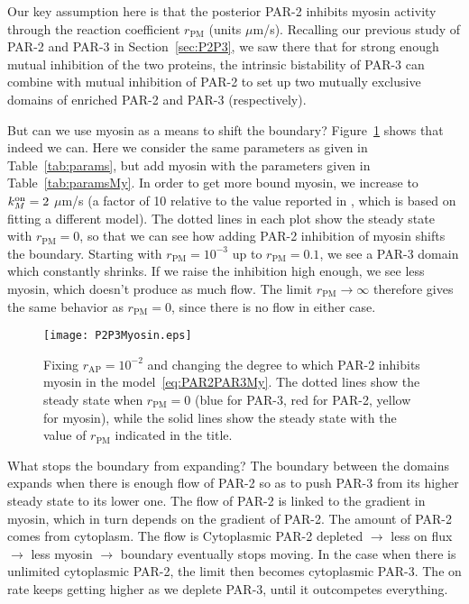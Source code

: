 \documentclass[11pt]{article}
\newcommand{\6}[1]{#1_{\text{6}}}
\newcommand{\3}[1]{#1_{\text{3}}}
\begin{document}
Our key assumption here is that the posterior PAR-2 inhibits myosin activity through the reaction coefficient $r_\text{PM}$ (units $\mu$m/s). Recalling our previous study of PAR-2 and PAR-3 in Section\ \ref{sec:P2P3}, we saw there that for strong enough mutual inhibition of the two proteins, the intrinsic bistability of PAR-3 can combine with mutual inhibition of PAR-2 to set up two mutually exclusive domains of enriched PAR-2 and PAR-3 (respectively). 

But can we use myosin as a means to shift the boundary? Figure\ \ref{fig:P2P3My} shows that indeed we can. Here we consider the same parameters as given in Table\ \ref{tab:params}, but add myosin with the parameters given in Table\ \ref{tab:paramsMy}. In order to get more bound myosin, we increase to $k^\text{on}_M=2$ $\mu$m/s (a factor of 10 relative to the value reported in \cite{gross2019guiding}, which is based on fitting a different model). The dotted lines in each plot show the steady state with $r_\text{PM}=0$, so that we can see how adding PAR-2 inhibition of myosin shifts the boundary. Starting with $r_\text{PM}=10^{-3}$ up to $r_\text{PM}=0.1$, we see a PAR-3 domain which constantly shrinks. If we raise the inhibition high enough, we see less myosin, which doesn't produce as much flow. The limit $r_\text{PM} \rightarrow \infty$ therefore gives the same behavior as $r_\text{PM}=0$, since there is no flow in either case.

\begin{figure}
\centering
\texttt{[image: P2P3Myosin.eps]}
\caption{\label{fig:P2P3My} Fixing $r_\text{AP}=10^{-2}$ and changing the degree to which PAR-2 inhibits myosin in the model\ \eqref{eq:PAR2PAR3My}. The dotted lines show the steady state when $r_\text{PM}=0$ (blue for PAR-3, red for PAR-2, yellow for myosin), while the solid lines show the steady state with the value of $r_\text{PM}$ indicated in the title.}
\end{figure}

What stops the boundary from expanding? 
The boundary between the domains expands when there is enough flow of PAR-2 so as to push PAR-3 from its higher steady state to its lower one. The flow of PAR-2 is linked to the gradient in myosin, which in turn depends on the gradient of PAR-2. The amount of PAR-2 comes from cytoplasm. The flow is Cytoplasmic PAR-2 depleted $\rightarrow$ less on flux $\rightarrow$ less myosin $\rightarrow$ boundary eventually stops moving. In the case when there is unlimited cytoplasmic PAR-2, the limit then becomes cytoplasmic PAR-3. The on rate keeps getting higher as we deplete PAR-3, until it outcompetes everything.
\end{document}
